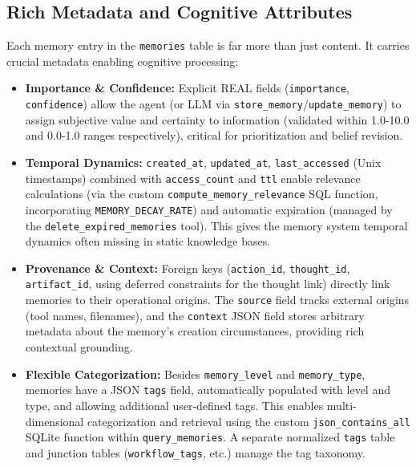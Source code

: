 \documentclass[12pt,a4paper]{article}
\newcommand{\code}[1]{\nolinkurl{#1}}
\begin{document}
\subsection{Rich Metadata and Cognitive Attributes}

Each memory entry in the \code{memories} table is far more than just content. It carries crucial metadata enabling cognitive processing:

\begin{itemize}
    \item \textbf{Importance \& Confidence:} Explicit REAL fields (\code{importance}, \code{confidence}) allow the agent (or LLM via \code{store\_memory}/\code{update\_memory}) to assign subjective value and certainty to information (validated within 1.0-10.0 and 0.0-1.0 ranges respectively), critical for prioritization and belief revision.

    \item \textbf{Temporal Dynamics:} \code{created\_at}, \code{updated\_at}, \code{last\_accessed} (Unix timestamps) combined with \code{access\_count} and \code{ttl} enable relevance calculations (via the custom \code{compute\_memory\_relevance} SQL function, incorporating \code{MEMORY\_DECAY\_RATE}) and automatic expiration (managed by the \code{delete\_expired\_memories} tool). This gives the memory system temporal dynamics often missing in static knowledge bases.

    \item \textbf{Provenance \& Context:} Foreign keys (\code{action\_id}, \code{thought\_id}, \code{artifact\_id}, using deferred constraints for the thought link) directly link memories to their operational origins. The \code{source} field tracks external origins (tool names, filenames), and the \code{context} JSON field stores arbitrary metadata about the memory's creation circumstances, providing rich contextual grounding.

    \item \textbf{Flexible Categorization:} Besides \code{memory\_level} and \code{memory\_type}, memories have a JSON \code{tags} field, automatically populated with level and type, and allowing additional user-defined tags. This enables multi-dimensional categorization and retrieval using the custom \code{json\_contains\_all} SQLite function within \code{query\_memories}. A separate normalized \code{tags} table and junction tables (\code{workflow\_tags}, etc.) manage the tag taxonomy.
\end{itemize}
\end{document}
